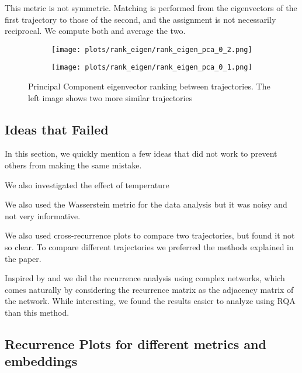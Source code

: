 \documentclass[a4paper,12pt]{article}
\begin{document}
This metric is not symmetric. Matching is performed from the eigenvectors of the first trajectory to those of the second, and the assignment is not necessarily reciprocal. We compute both and average the two.

\begin{figure}[H]
    \centering
    \begin{subfigure}[b]{0.48\linewidth}
        \centering
        \texttt{[image: plots/rank\_eigen/rank\_eigen\_pca\_0\_2.png]}
    \end{subfigure}\hfill
    \begin{subfigure}[b]{0.48\linewidth}
        \centering
        \texttt{[image: plots/rank\_eigen/rank\_eigen\_pca\_0\_1.png]}
    \end{subfigure}
    \caption{Principal Component eigenvector ranking between trajectories. The left image shows two more similar trajectories} %
    \label{fig:rank_eigen}
\end{figure}


\subsection{Ideas that Failed}
\label{subsec:appendix_failed_ideas} %
In this section, we quickly mention a few ideas that did not work to prevent others from making the same mistake.

We also investigated the effect of temperature

We also used the Wasserstein metric for the data analysis but it was noisy and not very informative.

We also used cross-recurrence plots to compare two trajectories, but found it not so clear. To compare different trajectories we preferred the methods explained in the paper.

Inspired by \cite{DONNER_2011} and \cite{Donner_2010} \cite{ZOU20191} we did the recurrence analysis using complex networks, which comes naturally by considering the recurrence matrix as the adjacency matrix of the network. While interesting, we found the results easier to analyze using RQA than this method. %

\subsection{Recurrence Plots for different metrics and embeddings} %
\end{document}

